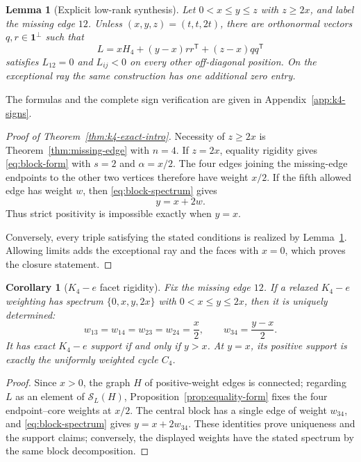 \documentclass[11pt,reqno]{amsart}
\newtheorem{corollary}[theorem]{Corollary}
\newtheorem{lemma}[theorem]{Lemma}
\theoremstyle{definition}
\theoremstyle{remark}
\newcommand{\one}{\mathbf 1}
\newcommand{\SL}{\mathcal S_L}
\begin{document}
\begin{lemma}[Explicit low-rank synthesis]\label{lem:k4-synthesis}
Let $0<x\le y\le z$ with $z\ge2x$, and label the missing edge $12$.  Unless
$(x,y,z)=(t,t,2t)$, there are orthonormal vectors $q,r\in\one^\perp$ such that
\begin{equation}\label{eq:k4-L}
  L=xH_4+(y-x)rr^{\mathsf T}+(z-x)qq^{\mathsf T}
\end{equation}
satisfies $L_{12}=0$ and $L_{ij}<0$ on every other off-diagonal position.
On the exceptional ray the same construction has one additional zero entry.
\end{lemma}

The formulas and the complete sign verification are given in
Appendix~\ref{app:k4-signs}.

\begin{proof}[Proof of Theorem~\ref{thm:k4-exact-intro}]
Necessity of $z\ge2x$ is Theorem~\ref{thm:missing-edge} with $n=4$.
If $z=2x$, equality rigidity gives \eqref{eq:block-form} with
$s=2$ and $\alpha=x/2$.  The four edges joining the missing-edge endpoints to
the other two vertices therefore have weight $x/2$.  If the fifth allowed
edge has weight $w$, then \eqref{eq:block-spectrum} gives
\[
  y=x+2w.
\]
Thus strict positivity is impossible exactly when $y=x$.

Conversely, every triple satisfying the stated conditions is realized by
Lemma~\ref{lem:k4-synthesis}.  Allowing limits adds the exceptional ray and
the faces with $x=0$, which proves the closure statement.
\end{proof}

\begin{corollary}[$K_4-e$ facet rigidity]
\label{cor:k4-facet-rigidity}
Fix the missing edge $12$.  If a relaxed $K_4-e$ weighting has spectrum
$\{0,x,y,2x\}$ with $0<x\le y\le2x$, then it is uniquely determined:
\[
  w_{13}=w_{14}=w_{23}=w_{24}=\frac x2,
  \qquad w_{34}=\frac{y-x}{2}.
\]
It has exact $K_4-e$ support if and only if $y>x$.  At $y=x$, its positive
support is exactly the uniformly weighted cycle $C_4$.
\end{corollary}

\begin{proof}
Since $x>0$, the graph $H$ of positive-weight edges is connected; regarding
$L$ as an element of $\SL(H)$, Proposition~\ref{prop:equality-form} fixes the
four endpoint--core weights at $x/2$.  The central block has a single edge of
weight $w_{34}$, and
\eqref{eq:block-spectrum} gives $y=x+2w_{34}$.  These identities prove
uniqueness and the support claims; conversely, the displayed weights have the
stated spectrum by the same block decomposition.
\end{proof}
\end{document}
